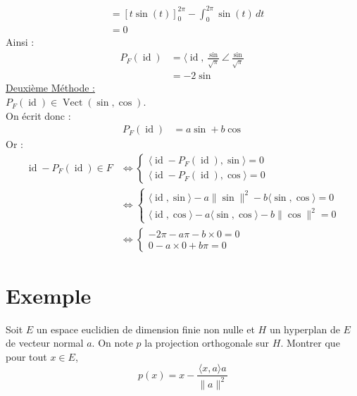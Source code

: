 \documentclass[../main.tex]{subfiles}
\begin{document}
\begin{itemize}
\begin{align*}
        &= \left[ t\sin(t) \right]_0^{2\pi} - \int_0^{2\pi} \sin(t) \,dt \\
        &= 0
    \end{align*}
    Ainsi : 
    \begin{align*}
        P_F(\operatorname{id}) &= \langle \operatorname{id}, \frac{\sin}{\sqrt{\pi}}\angle \frac{\sin}{\sqrt{\pi}} \\
        &= -2\sin
    \end{align*}
    \underline{Deuxième Méthode :} \\
    $P_F(\operatorname{id})\in \operatorname{Vect}(\sin, \cos)$. \\
    On écrit donc : 
    \begin{align*}
        P_F(\operatorname{id}) &= a\sin + b\cos
    \end{align*}
    Or : 
    \begin{align*}
        \operatorname{id} - P_F(\operatorname{id}) \in F &\Leftrightarrow \begin{cases}
            \langle \operatorname{id} - P_F(\operatorname{id}), \sin\rangle = 0 \\
            \langle \operatorname{id} - P_F(\operatorname{id}), \cos\rangle = 0
        \end{cases} \\
        &\Leftrightarrow \begin{cases}
            \langle \operatorname{id}, \sin\rangle - a\|\sin\|^2 - b\langle \sin, \cos\rangle = 0 \\
            \langle \operatorname{id}, \cos\rangle - a\langle \sin, \cos\rangle - b\|\cos\|^2 = 0
        \end{cases} \\
        &\Leftrightarrow \begin{cases}
            -2\pi - a\pi - b\times 0 = 0 \\
            0 - a\times 0 + b\pi = 0
        \end{cases}
    \end{align*}
\end{itemize}

\section{Exemple}
\begin{tcolorbox}[title=Exemple 34.50, title filled=false, colframe=darkgreen, colback=darkgreen!10!white]
    Soit $E$ un espace euclidien de dimension finie non nulle et $H$ un hyperplan de $E$ de vecteur normal $a$. On note $p$ la projection orthogonale sur $H$. Montrer que pour tout $x \in E$,
    $$p(x)=x-\frac{\langle x, a\rangle a}{\|a\|^2}$$
\end{tcolorbox}
\end{document}
